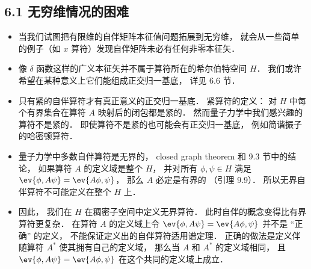 
\begin{issues}
\issueDraft
\end{issues}

\subsection{6.1 无穷维情况的困难}

\begin{itemize}
\item 当我们试图把有限维的自伴矩阵本征值问题拓展到无穷维， 就会从一些简单的例子（如 $x$ 算符）发现自伴矩阵未必有任何非零本征矢．

\item 像 $\delta$ 函数这样的广义本征矢并不属于算符所在的希尔伯特空间 $H$． 我们或许希望在某种意义上它们能组成正交归一基底， 详见 6.6 节．

\item 只有紧的自伴算符才有真正意义的正交归一基底． 紧算符的定义： 对 $H$ 中每个有界集合在算符 $A$ 映射后的闭包都是紧的． 然而量子力学中我们感兴趣的算符不是紧的． 即使算符不是紧的也可能会有正交归一基底， 例如简谐振子的哈密顿算符．

\item 量子力学中多数自伴算符是无界的， closed graph theorem 和 9.3 节中的结论， 如果算符 $A$ 的定义域是整个 $H$， 并对所有 $\phi,\psi\in H$ 满足 $\ev{\phi, A\psi} = \ev{A\phi, \psi}$， 那么 $A$ 必定是有界的 （引理 9.9）． 所以无界自伴算符不可能定义在整个 $H$ 上．

\item 因此， 我们在 $H$ 在稠密子空间中定义无界算符． 此时自伴的概念变得比有界算符更复杂． 在算符 $A$ 的定义域上令 $\ev{\phi, A\psi} = \ev{A\phi, \psi}$ 并不是 “正确” 的定义， 不能保证定义出的自伴算符适用谱定理． 正确的做法是定义伴随算符 $A^*$ 使其拥有自己的定义域， 那么当 $A$ 和 $A^*$ 的定义域相同， 且 $\ev{\phi, A\psi} = \ev{A\phi, \psi}$ 在这个共同的定义域上成立．
\end{itemize}

